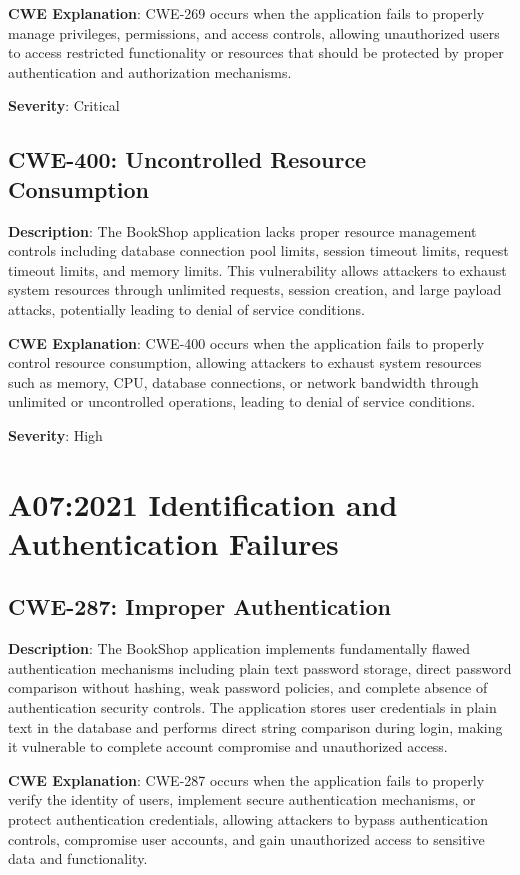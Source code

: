 \documentclass[]{UCD_CS_FYP_Report}
\begin{document}
\textbf{CWE Explanation}: CWE-269 occurs when the application fails to properly manage privileges, permissions, and access controls, allowing unauthorized users to access restricted functionality or resources that should be protected by proper authentication and authorization mechanisms.

\textbf{Severity}: Critical



\section{CWE-400: Uncontrolled Resource Consumption}

\textbf{Description}: The BookShop application lacks proper resource management controls including database connection pool limits, session timeout limits, request timeout limits, and memory limits. This vulnerability allows attackers to exhaust system resources through unlimited requests, session creation, and large payload attacks, potentially leading to denial of service conditions.

\textbf{CWE Explanation}: CWE-400 occurs when the application fails to properly control resource consumption, allowing attackers to exhaust system resources such as memory, CPU, database connections, or network bandwidth through unlimited or uncontrolled operations, leading to denial of service conditions.

\textbf{Severity}: High



\chapter{A07:2021 Identification and Authentication Failures}

\section{CWE-287: Improper Authentication}

\textbf{Description}: The BookShop application implements fundamentally flawed authentication mechanisms including plain text password storage, direct password comparison without hashing, weak password policies, and complete absence of authentication security controls. The application stores user credentials in plain text in the database and performs direct string comparison during login, making it vulnerable to complete account compromise and unauthorized access.

\textbf{CWE Explanation}: CWE-287 occurs when the application fails to properly verify the identity of users, implement secure authentication mechanisms, or protect authentication credentials, allowing attackers to bypass authentication controls, compromise user accounts, and gain unauthorized access to sensitive data and functionality.
\end{document}
